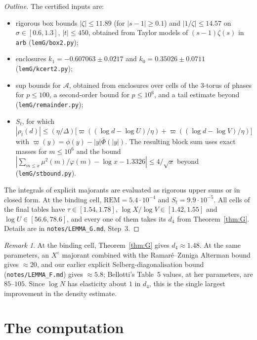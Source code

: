 \documentclass[11pt]{amsart}
\numberwithin{equation}{section}
\theoremstyle{definition}
\theoremstyle{remark}
\newtheorem{remark}[theorem]{Remark}
\newcommand{\eps}{\varepsilon}
\newcommand{\code}[1]{\texttt{#1}}
\begin{document}
\begin{proof}[Outline]
The certified inputs are:
\begin{itemize}
\item rigorous box bounds $|\zeta| \le 11.89$ (for $|s-1|\ge 0.1$) and $|1/\zeta| \le 14.57$ on $\sigma\in[0.6,1.3]$, $|t|\le450$, obtained from Taylor models of $(s-1)\zeta(s)$ in \code{arb} (\code{lemG/box2.py});
\item enclosures $k_1 = -0.607063\pm0.0217$ and $k_0 = 0.35026\pm0.0711$ (\code{lemG/kcert2.py});
\item sup bounds for $\mathcal A$, obtained from enclosures over cells of the $3$-torus of phases for $p\le100$, a second-order bound for $p\le10^6$, and a tail estimate beyond (\code{lemG/remainder.py});
\item $S_t$, for which $|\rho_t(d)| \le (\eta/\Delta)\big[\varpi((\log d - \log U)/\eta) + \varpi((\log d - \log V)/\eta)\big]$ with $\varpi(y) = \phi(y) - |y|\bar\Phi(|y|)$.
  The resulting block sum uses exact masses for $m\le10^6$ and the bound $|\sum_{m\le x}\mu^2(m)/\varphi(m) - \log x - 1.3326| \le 4/\sqrt x$ \cite{RamareAkhilesh} beyond (\code{lemG/stbound.py}).
\end{itemize}
The integrals of explicit majorants are evaluated as rigorous upper sums or in closed form.
At the binding cell, $\mathrm{REM} = 5.4\cdot10^{-4}$ and $S_t = 9.9\cdot10^{-5}$.
All cells of the final tables have $\tau\in[1.54,1.78]$, $\log X/\log V\in[1.42,1.55]$ and $\log U\in[56.6,78.6]$, and every one of them takes its $d_4$ from Theorem~\ref{thm:G}.
Details are in \code{notes/LEMMA\_G.md}, Step~3.
\end{proof}

\begin{remark}
At the binding cell, Theorem~\ref{thm:G} gives $d_4 \approx 1.48$.
At the same parameters, an $X^\eps$ majorant combined with the Ramar\'e--Zuniga Alterman bound \cite{RZA} gives $\approx 20$, and our earlier explicit Selberg-diagonalisation bound (\code{notes/LEMMA\_F.md}) gives $\approx 5.8$; Bellotti's Table~5 values, at her parameters, are $85$--$105$.
Since $\log N$ has elasticity about $1$ in $d_4$, this is the single largest improvement in the density estimate.
\end{remark}
\section{The computation}\label{sec:computation}
\end{document}
